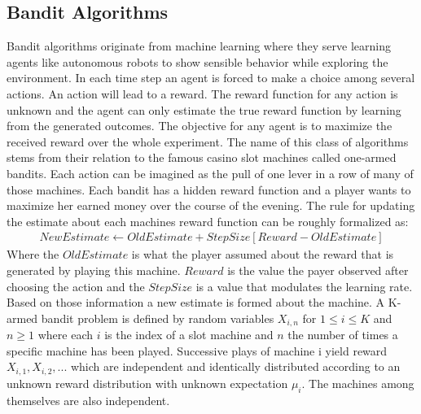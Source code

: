 \documentclass[main.tex]{subfiles}
\begin{document}
\subsection{Bandit Algorithms}
Bandit algorithms originate from machine learning where they serve learning agents like autonomous robots to show sensible behavior while exploring the environment. In each time step an agent is forced to make a choice among several actions. An action will lead to a reward. The reward function for any action is unknown and the agent can only estimate the true reward function by learning from the generated outcomes. The objective for any agent is to maximize the received reward over the whole experiment. The name of this class of algorithms stems from their relation to the famous casino slot machines called one-armed bandits. Each action can be imagined as the pull of one lever in a row of many of those machines. Each bandit has a hidden reward function and a player wants to maximize her earned money over the course of the evening. The rule for updating the estimate about each machines reward function can be roughly formalized as:
\begin{align*}
NewEstimate \leftarrow OldEstimate + StepSize[Reward - OldEstimate]
\end{align*}
Where the $OldEstimate$ is what the player assumed about the reward that is generated by playing this machine. $Reward$ is the value the payer observed after choosing the action and the $StepSize$ is a value that modulates the learning rate. Based on those information a new estimate is formed about the machine. A K-armed bandit problem is defined by random variables $X_{i,n}$ for $1 \leq i \leq K$ and $n\geq1$ where each $i$ is the index of a slot machine and $n$ the number of times a specific machine has been played. Successive plays of machine i yield reward $X_{i,1},X_{i,2},...$ which are independent and identically distributed according to an unknown reward distribution with unknown expectation $\mu_i$. The machines among themselves are also independent.
\end{document}
